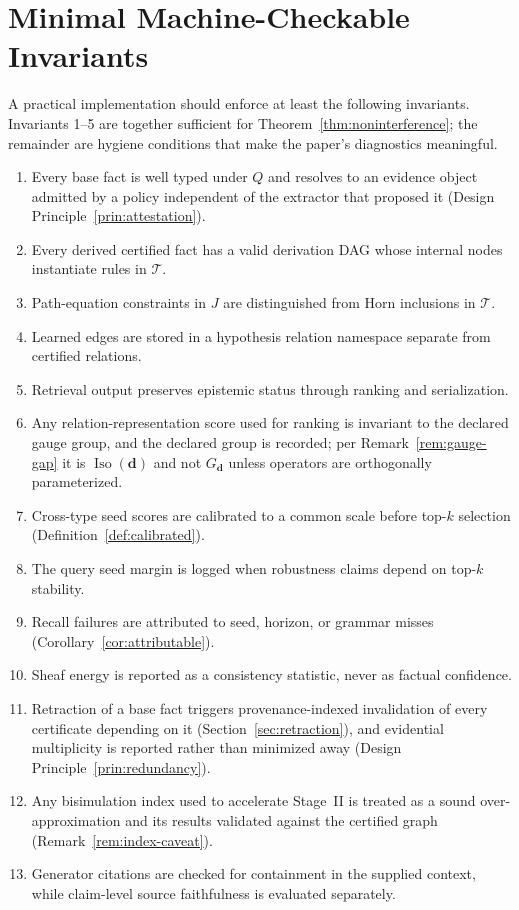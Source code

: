 \documentclass[11pt]{article}
\newcommand{\Iso}{\operatorname{Iso}}
\newcommand{\T}{\mathcal{T}}
\begin{document}
\section{Minimal Machine-Checkable Invariants}
\label{app:invariants}
A practical implementation should enforce at least the following invariants. Invariants 1--5 are together sufficient for Theorem~\ref{thm:noninterference}; the remainder are hygiene conditions that make the paper's diagnostics meaningful.
\begin{enumerate}[leftmargin=*]
    \item Every base fact is well typed under $Q$ and resolves to an evidence object admitted by a policy independent of the extractor that proposed it (Design Principle~\ref{prin:attestation}).
    \item Every derived certified fact has a valid derivation DAG whose internal nodes instantiate rules in $\T$.
    \item Path-equation constraints in $J$ are distinguished from Horn inclusions in $\T$.
    \item Learned edges are stored in a hypothesis relation namespace separate from certified relations.
    \item Retrieval output preserves epistemic status through ranking and serialization.
    \item\label{prin:gauge-log} Any relation-representation score used for ranking is invariant to the declared gauge group, and the declared group is recorded; per Remark~\ref{rem:gauge-gap} it is $\Iso(\bm d)$ and not $G_{\bm d}$ unless operators are orthogonally parameterized.
    \item Cross-type seed scores are calibrated to a common scale before top-$k$ selection (Definition~\ref{def:calibrated}).
    \item The query seed margin is logged when robustness claims depend on top-$k$ stability.
    \item Recall failures are attributed to seed, horizon, or grammar misses (Corollary~\ref{cor:attributable}).
    \item Sheaf energy is reported as a consistency statistic, never as factual confidence.
    \item Retraction of a base fact triggers provenance-indexed invalidation of every certificate depending on it (Section~\ref{sec:retraction}), and evidential multiplicity is reported rather than minimized away (Design Principle~\ref{prin:redundancy}).
    \item Any bisimulation index used to accelerate Stage~II is treated as a sound over-approximation and its results validated against the certified graph (Remark~\ref{rem:index-caveat}).
    \item Generator citations are checked for containment in the supplied context, while claim-level source faithfulness is evaluated separately.
\end{enumerate}
\end{document}
